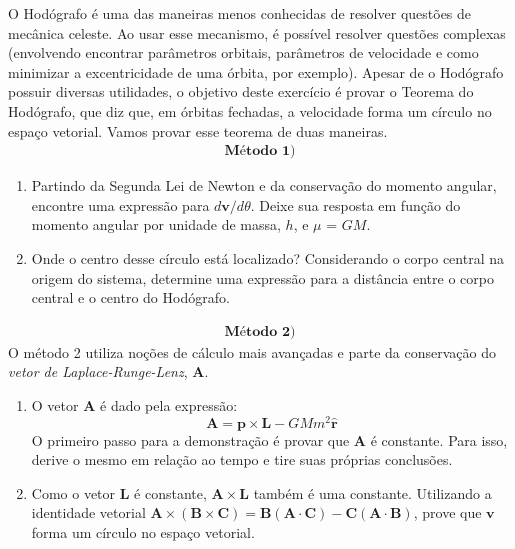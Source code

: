 \documentclass[11pt]{article}
\begin{document}
\begin{pproblem}
    O Hodógrafo é uma das maneiras menos conhecidas de resolver questões de mecânica celeste. Ao usar esse mecanismo, é possível resolver questões complexas (envolvendo encontrar parâmetros orbitais, parâmetros de velocidade e como minimizar a excentricidade de uma órbita, por exemplo). Apesar de o Hodógrafo possuir diversas utilidades, o objetivo deste exercício é provar o Teorema do Hodógrafo, que diz que, em órbitas fechadas, a velocidade forma um círculo no espaço vetorial. Vamos provar esse teorema de duas maneiras.
    \begin{align*}
    \textbf{Método 1)}
    \end{align*}
    \begin{enumerate}[label=\textbf{\Roman*.}]
        \item Partindo da Segunda Lei de Newton e da conservação do momento angular, encontre uma expressão para \(d\mathbf{v}/d\theta\). Deixe sua resposta em função do momento angular por unidade de massa, \(h\), e \(\mu\) = \(GM\). 
        \item Onde o centro desse círculo está localizado? Considerando o corpo central na origem do sistema, determine uma expressão para a distância entre o corpo central e o centro do Hodógrafo. 
    \end{enumerate}
    
    \begin{align*}
        \textbf{Método 2)}
    \end{align*}
    O método 2 utiliza noções de cálculo mais avançadas e parte da conservação do \textit{vetor de Laplace-Runge-Lenz}, \(\mathbf{A}\).
    \begin{enumerate}[label=\textbf{\Roman*.}]
        \item O vetor \(\mathbf{A}\) é dado pela expressão:
        \[
        \mathbf{A} = \mathbf{p}\times \mathbf{L} - GMm^2\mathbf{\hat{r}}
        \]
        O primeiro passo para a demonstração é provar que \(\mathbf{A}\) é constante. Para isso, derive o mesmo em relação ao tempo e tire suas próprias conclusões.
        \item Como o vetor \(\mathbf{L}\) é constante, \(\mathbf{A}\times\mathbf{L}\) também é uma constante. Utilizando a identidade vetorial \(\mathbf{A}\times(\mathbf{B}\times\mathbf{C}) = \mathbf{B}(\mathbf{A}\cdot\mathbf{C}) - \mathbf{C}(\mathbf{A}\cdot\mathbf{B}) \), prove que \(\mathbf{v}\) forma um círculo no espaço vetorial.    
    \end{enumerate}
    
\end{pproblem}
\end{document}
